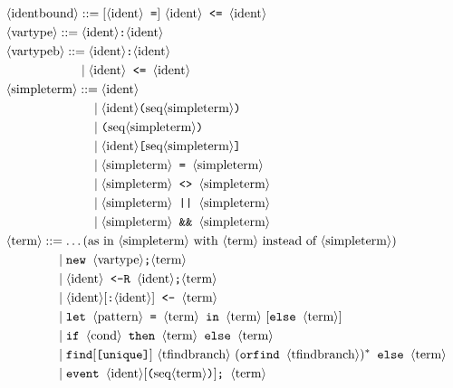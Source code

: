 \begin{figure}
\def\phst{\phantom{\nonterm{simpleterm} = }\mid}
\def\pht{\phantom{\nonterm{term} = }\mid}
\def\phpat{\phantom{\nonterm{pattern} = }\mid}
\def\phq{\phantom{\nonterm{query} = }\mid}
\def\phqt{\phantom{\nonterm{queryterm} = }\mid}
\begin{align*}
&\nonterm{identbound} ::= [\nonterm{ident}\texttt{ =}]\ \nonterm{ident} \texttt{ <= }\nonterm{ident}\\
&\nonterm{vartype} ::= \nonterm{ident} \texttt{:}\nonterm{ident}\\
&\nonterm{vartypeb} ::= \nonterm{ident} \texttt{:}\nonterm{ident}\\
&\phantom{\nonterm{vartypeb} =}\mid \nonterm{ident} \texttt{ <= }\nonterm{ident}\\
&\nonterm{simpleterm} ::= \nonterm{ident}\\
&\phst \nonterm{ident}\texttt{(}\seq{simpleterm}\texttt{)}\\
&\phst \texttt{(}\seq{simpleterm}\texttt{)}\\
&\phst \nonterm{ident}\texttt{[}\seq{simpleterm}\texttt{]}\\
&\phst \nonterm{simpleterm} \texttt{ = } \nonterm{simpleterm} \\
&\phst \nonterm{simpleterm} \texttt{ <> } \nonterm{simpleterm} \\
&\phst \nonterm{simpleterm} \texttt{ || } \nonterm{simpleterm} \\
&\phst \nonterm{simpleterm} \texttt{ \&\& } \nonterm{simpleterm} \\
&\nonterm{term} ::= \ldots \text{(as in $\nonterm{simpleterm}$ with 
$\nonterm{term}$ instead of $\nonterm{simpleterm}$)}\\
&\pht \Resavt\texttt{;}\nonterm{term}\\
&\pht \Resbvt\texttt{;}\nonterm{term}\\
&\pht \nonterm{ident}[\texttt{:}\nonterm{ident}] \texttt{ <- } \nonterm{term}\\
&\pht \texttt{let } \nonterm{pattern} \texttt{ = }\nonterm{term}\texttt{ in }\nonterm{term}\ [\texttt{else }\nonterm{term}]\\
&\pht \texttt{if }\nonterm{cond}\texttt{ then } \nonterm{term} \texttt{ else }\nonterm{term}\\
&\pht \texttt{find}[\texttt{[unique]}]\ \nonterm{tfindbranch}\ (\texttt{orfind }\nonterm{tfindbranch})^*\texttt{ else }\nonterm{term}\\
&\pht \texttt{event }\nonterm{ident}[\texttt{(}\seq{term}\texttt{)}]\texttt{; }\nonterm{term}\\

\end{align*}
\end{figure}

